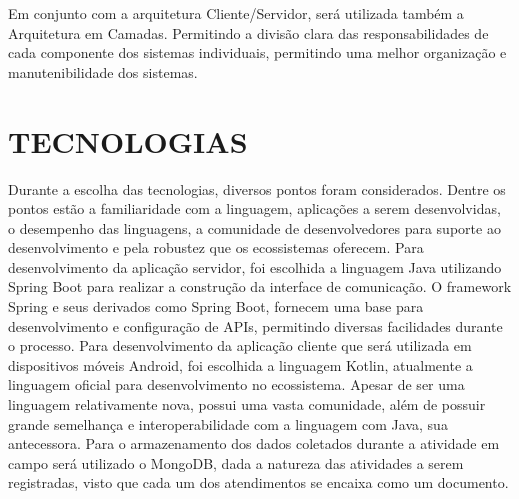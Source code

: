 Em conjunto com a arquitetura Cliente/Servidor, será utilizada também a Arquitetura em Camadas. Permitindo a divisão clara das responsabilidades de cada componente dos sistemas individuais, permitindo uma melhor organização e manutenibilidade dos sistemas.

\section{TECNOLOGIAS}
Durante a escolha das tecnologias, diversos pontos foram considerados. Dentre os pontos estão a familiaridade com a linguagem, aplicações a serem desenvolvidas, o desempenho das linguagens, a comunidade de desenvolvedores para suporte ao desenvolvimento e pela robustez que os ecossistemas oferecem. 
Para desenvolvimento da aplicação servidor, foi escolhida a linguagem Java utilizando Spring Boot para realizar a construção da interface de comunicação. O framework Spring e seus derivados como Spring Boot, fornecem uma base para desenvolvimento e configuração de APIs, permitindo diversas facilidades durante o processo.
Para desenvolvimento da aplicação cliente que será utilizada em dispositivos móveis Android, foi escolhida a linguagem Kotlin, atualmente a linguagem oficial para desenvolvimento no ecossistema. Apesar de ser uma linguagem relativamente nova, possui uma vasta comunidade, além de possuir grande semelhança e interoperabilidade com a linguagem com Java, sua antecessora.
Para o armazenamento dos dados coletados durante a atividade em campo será utilizado o MongoDB, dada a natureza das atividades a serem registradas, visto que cada um dos atendimentos se encaixa como um documento.

